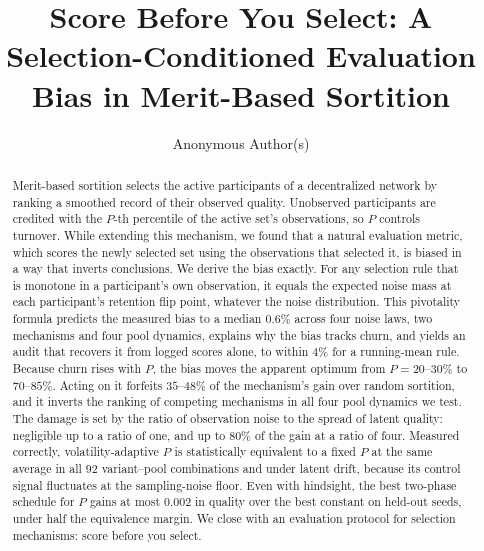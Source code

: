 \documentclass[sigconf,anonymous,review,nonacm]{acmart}
\begin{document}
\title{Score Before You Select: A Selection-Conditioned Evaluation Bias in Merit-Based Sortition}

\author{Anonymous Author(s)}

\begin{abstract}
Merit-based sortition selects the active participants of a decentralized network by
ranking a smoothed record of their observed quality. Unobserved participants are credited
with the $P$-th percentile of the active set's observations, so $P$ controls turnover. While
extending this mechanism, we found that a natural evaluation metric, which scores the newly
selected set using the observations that selected it, is biased in a way that inverts
conclusions. We derive the bias exactly. For any selection rule that is monotone in a
participant's own observation, it equals the expected noise mass at each participant's
retention flip point, whatever the noise distribution. This pivotality formula predicts
the measured bias to a median $0.6\%$ across four noise laws, two mechanisms and four pool
dynamics, explains why the bias tracks churn, and yields an audit that recovers it from
logged scores alone, to within $4\%$ for a running-mean rule. Because churn rises with $P$, the bias moves the apparent
optimum from $P=20$--$30\%$ to $70$--$85\%$. Acting on it forfeits $35$--$48\%$ of the
mechanism's gain over random sortition, and it inverts the ranking of competing mechanisms
in all four pool dynamics we test. The damage is set by the ratio of observation noise to
the spread of latent quality: negligible up to a ratio of one, and up to $80\%$ of the gain
at a ratio of four. Measured correctly, volatility-adaptive $P$ is
statistically equivalent to a fixed $P$ at the same average in all $92$ variant--pool
combinations and under latent drift, because its control signal fluctuates at the
sampling-noise floor. Even with hindsight, the best two-phase schedule for $P$ gains at
most $0.002$ in quality over the best constant on held-out seeds, under half the
equivalence margin. We close with an evaluation protocol for
selection mechanisms: score before you select.
\end{abstract}


\maketitle
\end{document}
